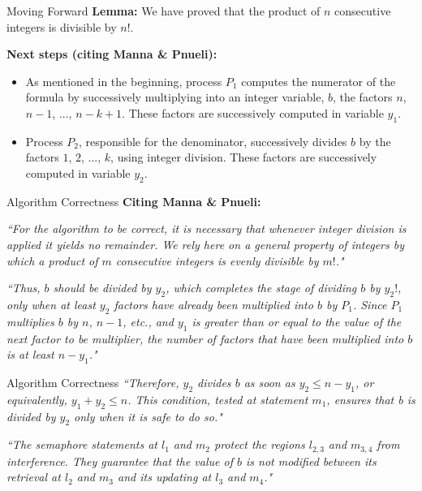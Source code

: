 \documentclass[xcolor=dvipsnames]{beamer}
\begin{document}
\begin{frame}{Moving Forward}
	\textbf{Lemma:} We have proved that the product of $n$ consecutive integers is divisible by $n!$.
	
	\hfill
	
	\pause
	
	\textbf{Next steps (citing Manna \& Pnueli):} 
	\begin{itemize}
		\item<2-> As mentioned in the beginning, process $P_1$ computes the numerator of the formula by successively multiplying into an integer variable, $b$, the factors $n$, $n-1$, ..., $n-k+1$. These factors are successively computed in variable $y_1$.
		
		\item<3-> Process $P_2$, responsible for the denominator, successively divides $b$ by the factors $1$, $2$, ..., $k$, using integer division. These factors are successively computed in variable $y_2$. 
	\end{itemize}
\end{frame}

\begin{frame}{Algorithm Correctness}
\textbf{Citing Manna \& Pnueli:}
 
\hfill

\textit{``For the algorithm to be correct, it is necessary that whenever integer division is applied it yields no remainder. We rely here on a general property of integers by which a product of $m$ consecutive integers is evenly divisible by $m!$."}

\hfill
\pause

\textit{``Thus, $b$ should be divided by $y_2$, which completes the stage of dividing $b$ by $y_2!$, only when at least $y_2$ factors have already been multiplied into $b$ by $P_1$. Since $P_1$ multiplies $b$ by $n$, $n-1$, etc., and $y_1$ is greater than or equal to the value of the next factor to be multiplier, the number of factors that have been multiplied into $b$ is at least $n-y_1$."}

\end{frame}

\begin{frame}{Algorithm Correctness}
\textit{``Therefore, $y_2$ divides $b$ as soon as $y_2 \leq n - y_1$, or equivalently, $y_1 + y_2 \leq n$. This condition, tested at statement $m_1$, ensures that b is divided by $y_2$ only when it is safe to do so."}

\hfill
\pause

\textit{``The semaphore statements at $l_1$ and $m_2$ protect the regions $l_{2,3}$ and $m_{3,4}$ from interference. They guarantee that the value of $b$ is not modified between its retrieval at $l_2$ and $m_3$ and its updating at $l_3$ and $m_4$."}


\end{frame}
\end{document}
